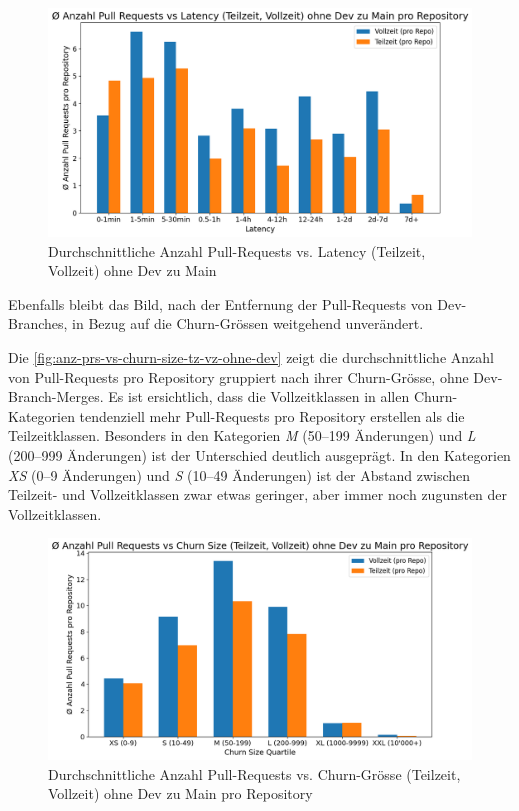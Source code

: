 \begin{figure}[htbp]
    \includegraphics[width=\textwidth]{Figures/anz-avg-prs-vs-latency-tv-no-dev.png}
    \caption{Durchschnittliche Anzahl Pull-Requests vs. Latency (Teilzeit, Vollzeit) ohne Dev zu Main}
    \label{fig:anz-avg-prs-vs-latency-tv-no-dev}
\end{figure}


Ebenfalls bleibt das Bild, nach der Entfernung der Pull-Requests von Dev-Branches, in Bezug auf die Churn-Grössen weitgehend unverändert.

Die \autoref{fig:anz-prs-vs-churn-size-tz-vz-ohne-dev} zeigt die durchschnittliche Anzahl von Pull-Requests pro Repository gruppiert nach ihrer Churn-Grösse, ohne Dev-Branch-Merges. Es ist ersichtlich, dass die Vollzeitklassen in allen Churn-Kategorien tendenziell mehr Pull-Requests pro Repository erstellen als die Teilzeitklassen. Besonders in den Kategorien \textit{M} (50–199 Änderungen) und \textit{L} (200–999 Änderungen) ist der Unterschied deutlich ausgeprägt. In den Kategorien \textit{XS} (0–9 Änderungen) und \textit{S} (10–49 Änderungen) ist der Abstand zwischen Teilzeit- und Vollzeitklassen zwar etwas geringer, aber immer noch zugunsten der Vollzeitklassen.

\begin{figure}[htbp]
    \includegraphics[width=\textwidth]{Figures/avg-anz-prs-vs-churn-size-tz-vz-pro-repo-ohne-dev.png}
    \caption{Durchschnittliche Anzahl Pull-Requests vs. Churn-Grösse (Teilzeit, Vollzeit) ohne Dev zu Main pro Repository}
    \label{fig:anz-prs-vs-churn-size-tz-vz-ohne-dev}
\end{figure}

